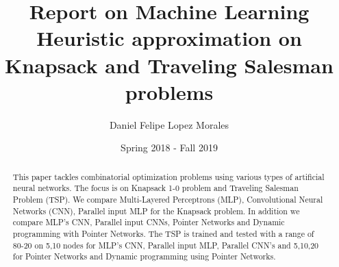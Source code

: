 \documentclass{iitthesis}
\begin{document}
\title{Report on Machine Learning Heuristic approximation on \\
   Knapsack and Traveling Salesman problems}
\author{Daniel Felipe Lopez Morales}
\date{Spring 2018 - Fall 2019}
\copyrightnoticefalse      %
\maketitle                %


\prelimpages         %

\tableofcontents
\clearpage

\listoftables

\clearpage

\listoffigures

\clearpage


\listofsymbols


 \clearpage



\begin{abstract}           %
\par This paper tackles combinatorial optimization problems using various types of artificial neural networks. The focus is on Knapsack 1-0 problem and Traveling Salesman Problem (TSP). We compare Multi-Layered Perceptrons (MLP), Convolutional Neural Networks (CNN), Parallel input MLP for the Knapsack problem. In addition we compare MLP’s CNN, Parallel input CNNs, Pointer Networks and Dynamic programming with Pointer Networks. The TSP is trained and tested with a range of 80-20 on 5,10 nodes for MLP’s CNN, Parallel input MLP, Parallel CNN’s and 5,10,20 for Pointer Networks and Dynamic programming using Pointer Networks.  
\end{abstract}
\end{document}
